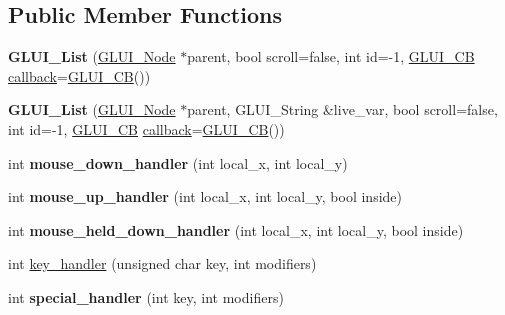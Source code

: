 \subsection*{Public Member Functions}
\begin{DoxyCompactItemize}
\item 
\hypertarget{classGLUI__List_ab4db3ba18344aa8839022a2ec70eb637}{{\bfseries G\-L\-U\-I\-\_\-\-List} (\hyperlink{classGLUI__Node}{G\-L\-U\-I\-\_\-\-Node} $\ast$parent, bool scroll=false, int id=-\/1, \hyperlink{classGLUI__CB}{G\-L\-U\-I\-\_\-\-C\-B} \hyperlink{classGLUI__Control_a96060fe0cc6d537e736dd6eef78e24ab}{callback}=\hyperlink{classGLUI__CB}{G\-L\-U\-I\-\_\-\-C\-B}())}\label{classGLUI__List_ab4db3ba18344aa8839022a2ec70eb637}

\item 
\hypertarget{classGLUI__List_ae0558ab509470184c35c543c16e33626}{{\bfseries G\-L\-U\-I\-\_\-\-List} (\hyperlink{classGLUI__Node}{G\-L\-U\-I\-\_\-\-Node} $\ast$parent, G\-L\-U\-I\-\_\-\-String \&live\-\_\-var, bool scroll=false, int id=-\/1, \hyperlink{classGLUI__CB}{G\-L\-U\-I\-\_\-\-C\-B} \hyperlink{classGLUI__Control_a96060fe0cc6d537e736dd6eef78e24ab}{callback}=\hyperlink{classGLUI__CB}{G\-L\-U\-I\-\_\-\-C\-B}())}\label{classGLUI__List_ae0558ab509470184c35c543c16e33626}

\item 
\hypertarget{classGLUI__List_a5ea7f0e79c85acc1910b13222c2892c4}{int {\bfseries mouse\-\_\-down\-\_\-handler} (int local\-\_\-x, int local\-\_\-y)}\label{classGLUI__List_a5ea7f0e79c85acc1910b13222c2892c4}

\item 
\hypertarget{classGLUI__List_a7e96dff4df0bfdc5918c54a84f2d5052}{int {\bfseries mouse\-\_\-up\-\_\-handler} (int local\-\_\-x, int local\-\_\-y, bool inside)}\label{classGLUI__List_a7e96dff4df0bfdc5918c54a84f2d5052}

\item 
\hypertarget{classGLUI__List_a2ab77fda1915950e01bea87a45013311}{int {\bfseries mouse\-\_\-held\-\_\-down\-\_\-handler} (int local\-\_\-x, int local\-\_\-y, bool inside)}\label{classGLUI__List_a2ab77fda1915950e01bea87a45013311}

\item 
int \hyperlink{classGLUI__List_a0d88a6b7a1c479420b85f246d3042d86}{key\-\_\-handler} (unsigned char key, int modifiers)
\item 
\hypertarget{classGLUI__List_a47649c2517c82edecd2f7376a284e1b6}{int {\bfseries special\-\_\-handler} (int key, int modifiers)}\label{classGLUI__List_a47649c2517c82edecd2f7376a284e1b6}


\end{DoxyCompactItemize}
